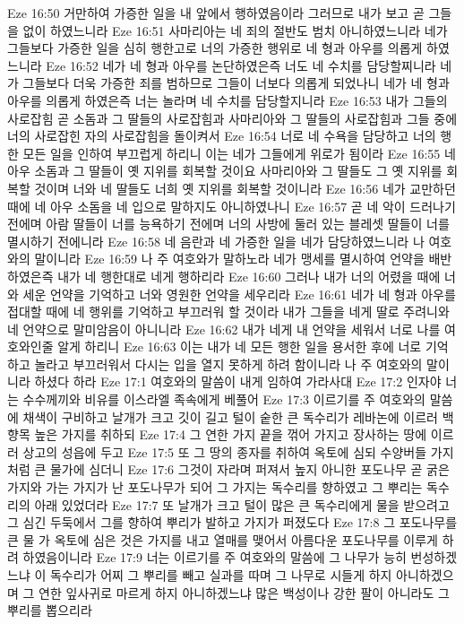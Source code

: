 Eze 16:50  거만하여 가증한 일을 내 앞에서 행하였음이라 그러므로 내가 보고 곧 그들을 없이 하였느니라
Eze 16:51  사마리아는 네 죄의 절반도 범치 아니하였느니라 네가 그들보다 가증한 일을 심히 행한고로 너의 가증한 행위로 네 형과 아우를 의롭게 하였느니라
Eze 16:52  네가 네 형과 아우를 논단하였은즉 너도 네 수치를 담당할찌니라 네가 그들보다 더욱 가증한 죄를 범하므로 그들이 너보다 의롭게 되었나니 네가 네 형과 아우를 의롭게 하였은즉 너는 놀라며 네 수치를 담당할지니라
Eze 16:53  내가 그들의 사로잡힘 곧 소돔과 그 딸들의 사로잡힘과 사마리아와 그 딸들의 사로잡힘과 그들 중에 너의 사로잡힌 자의 사로잡힘을 돌이켜서
Eze 16:54  너로 네 수욕을 담당하고 너의 행한 모든 일을 인하여 부끄럽게 하리니 이는 네가 그들에게 위로가 됨이라
Eze 16:55  네 아우 소돔과 그 딸들이 옛 지위를 회복할 것이요 사마리아와 그 딸들도 그 옛 지위를 회복할 것이며 너와 네 딸들도 너희 옛 지위를 회복할 것이니라
Eze 16:56  네가 교만하던 때에 네 아우 소돔을 네 입으로 말하지도 아니하였나니
Eze 16:57  곧 네 악이 드러나기 전에며 아람 딸들이 너를 능욕하기 전에며 너의 사방에 둘러 있는 블레셋 딸들이 너를 멸시하기 전에니라
Eze 16:58  네 음란과 네 가증한 일을 네가 담당하였느니라 나 여호와의 말이니라
Eze 16:59  나 주 여호와가 말하노라 네가 맹세를 멸시하여 언약을 배반하였은즉 내가 네 행한대로 네게 행하리라
Eze 16:60  그러나 내가 너의 어렸을 때에 너와 세운 언약을 기억하고 너와 영원한 언약을 세우리라
Eze 16:61  네가 네 형과 아우를 접대할 때에 네 행위를 기억하고 부끄러워 할 것이라 내가 그들을 네게 딸로 주려니와 네 언약으로 말미암음이 아니니라
Eze 16:62  내가 네게 내 언약을 세워서 너로 나를 여호와인줄 알게 하리니
Eze 16:63  이는 내가 네 모든 행한 일을 용서한 후에 너로 기억하고 놀라고 부끄러워서 다시는 입을 열지 못하게 하려 함이니라 나 주 여호와의 말이니라 하셨다 하라
Eze 17:1  여호와의 말씀이 내게 임하여 가라사대
Eze 17:2  인자야 너는 수수께끼와 비유를 이스라엘 족속에게 베풀어
Eze 17:3  이르기를 주 여호와의 말씀에 채색이 구비하고 날개가 크고 깃이 길고 털이 숱한 큰 독수리가 레바논에 이르러 백향목 높은 가지를 취하되
Eze 17:4  그 연한 가지 끝을 꺾어 가지고 장사하는 땅에 이르러 상고의 성읍에 두고
Eze 17:5  또 그 땅의 종자를 취하여 옥토에 심되 수양버들 가지처럼 큰 물가에 심더니
Eze 17:6  그것이 자라며 퍼져서 높지 아니한 포도나무 곧 굵은 가지와 가는 가지가 난 포도나무가 되어 그 가지는 독수리를 향하였고 그 뿌리는 독수리의 아래 있었더라
Eze 17:7  또 날개가 크고 털이 많은 큰 독수리에게 물을 받으려고 그 심긴 두둑에서 그를 향하여 뿌리가 발하고 가지가 퍼졌도다
Eze 17:8  그 포도나무를 큰 물 가 옥토에 심은 것은 가지를 내고 열매를 맺어서 아름다운 포도나무를 이루게 하려 하였음이니라
Eze 17:9  너는 이르기를 주 여호와의 말씀에 그 나무가 능히 번성하겠느냐 이 독수리가 어찌 그 뿌리를 빼고 실과를 따며 그 나무로 시들게 하지 아니하겠으며 그 연한 잎사귀로 마르게 하지 아니하겠느냐 많은 백성이나 강한 팔이 아니라도 그 뿌리를 뽑으리라
